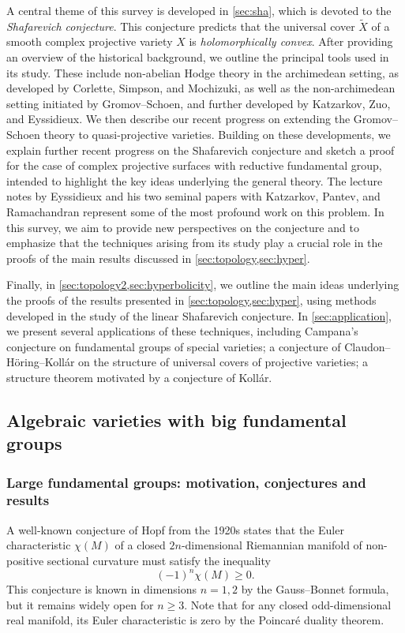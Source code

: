 \documentclass[english]{amsproc}
\theoremstyle{plain}
\theoremstyle{definition}
\theoremstyle{remark}
\theoremstyle{plain}
\numberwithin{equation}{thm} %
\begin{document}
	A central theme of this survey is developed in \cref{sec:sha}, which is devoted to the \emph{Shafarevich conjecture}. This conjecture predicts that the universal cover $\widetilde{X}$ of a smooth complex projective variety $X$ is \emph{holomorphically convex}.  After providing an overview of the historical background, we outline the principal tools used in its study. These include non-abelian Hodge theory in the archimedean setting, as developed by Corlette, Simpson, and Mochizuki, as well as the non-archimedean setting initiated by Gromov--Schoen, 	and further developed by Katzarkov, Zuo, and Eyssidieux.   We then describe our recent progress on extending the Gromov--Schoen theory to quasi-projective varieties. Building on these developments, we explain further recent progress on the Shafarevich conjecture and sketch a proof for the case of complex projective surfaces with reductive fundamental group, intended to highlight the key ideas underlying the general theory. The lecture notes by Eyssidieux \cite{Eys11} and his two seminal papers with Katzarkov, Pantev, and Ramachandran \cite{Eys04,EKPR12} represent some of the most profound work on this problem. In this survey, we aim to provide new perspectives on the conjecture and to emphasize that the 
	techniques arising from its study play a crucial role in the proofs of the main results 
	discussed in \cref{sec:topology,sec:hyper}.
	
	Finally, in \cref{sec:topology2,sec:hyperbolicity}, we outline the main ideas underlying the 
	proofs of the results presented in \cref{sec:topology,sec:hyper}, using methods developed in the 
	study of the linear Shafarevich conjecture. 
	In \cref{sec:application}, we present several applications of these techniques, including  Campana’s conjecture on fundamental groups of special varieties;
	a conjecture of Claudon--Höring--Kollár on the structure of universal covers of projective varieties;
	a structure theorem motivated by a conjecture of Kollár. 
	
	
	
	
	
	
	\subsection{Algebraic varieties with big fundamental groups}\label{sec:topology}
	\subsubsection{Large fundamental groups: motivation, conjectures and results}
	A well-known conjecture of Hopf from the 1920s states that the Euler characteristic 
	\(\chi(M)\) of a closed \(2n\)-dimensional Riemannian manifold of non-positive sectional curvature
	must satisfy the inequality
	\[
	(-1)^n \chi(M) \geq 0.
	\]
	This conjecture is known in dimensions \(n=1,2\) by the Gauss--Bonnet formula, but it remains
	widely open for \(n\geq 3\).  Note that for any closed odd-dimensional real manifold, 
	its Euler characteristic is zero by the Poincar\'e duality theorem.
	
\end{document}
